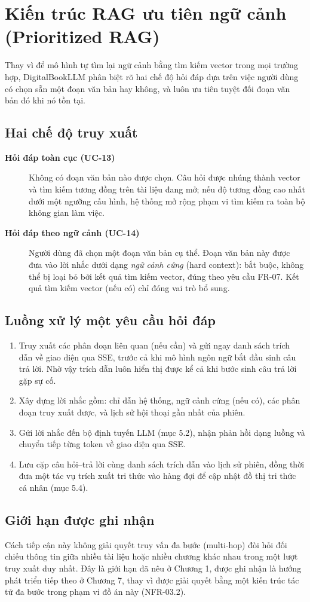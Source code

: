 \section{Kiến trúc RAG ưu tiên ngữ cảnh (Prioritized RAG)}
Thay vì để mô hình tự tìm lại ngữ cảnh bằng tìm kiếm vector trong mọi trường hợp, DigitalBookLLM phân biệt rõ hai chế độ hỏi đáp dựa trên việc người dùng có chọn sẵn một đoạn văn bản hay không, và luôn ưu tiên tuyệt đối đoạn văn bản đó khi nó tồn tại.

\subsection{Hai chế độ truy xuất}
\begin{description}
    \item[\textbf{Hỏi đáp toàn cục (UC-13)}] Không có đoạn văn bản nào được chọn. Câu hỏi được nhúng thành vector và tìm kiếm tương đồng trên tài liệu đang mở; nếu độ tương đồng cao nhất dưới một ngưỡng cấu hình, hệ thống mở rộng phạm vi tìm kiếm ra toàn bộ không gian làm việc.
    \item[\textbf{Hỏi đáp theo ngữ cảnh (UC-14)}] Người dùng đã chọn một đoạn văn bản cụ thể. Đoạn văn bản này được đưa vào lời nhắc dưới dạng \textit{ngữ cảnh cứng} (hard context): bắt buộc, không thể bị loại bỏ bởi kết quả tìm kiếm vector, đúng theo yêu cầu FR-07. Kết quả tìm kiếm vector (nếu có) chỉ đóng vai trò bổ sung.
\end{description}

\subsection{Luồng xử lý một yêu cầu hỏi đáp}
\begin{enumerate}
    \item Truy xuất các phân đoạn liên quan (nếu cần) và gửi ngay danh sách trích dẫn về giao diện qua SSE, trước cả khi mô hình ngôn ngữ bắt đầu sinh câu trả lời. Nhờ vậy trích dẫn luôn hiển thị được kể cả khi bước sinh câu trả lời gặp sự cố.
    \item Xây dựng lời nhắc gồm: chỉ dẫn hệ thống, ngữ cảnh cứng (nếu có), các phân đoạn truy xuất được, và lịch sử hội thoại gần nhất của phiên.
    \item Gửi lời nhắc đến bộ định tuyến LLM (mục 5.2), nhận phản hồi dạng luồng và chuyển tiếp từng token về giao diện qua SSE.
    \item Lưu cặp câu hỏi--trả lời cùng danh sách trích dẫn vào lịch sử phiên, đồng thời đưa một tác vụ trích xuất tri thức vào hàng đợi để cập nhật đồ thị tri thức cá nhân (mục 5.4).
\end{enumerate}

\subsection{Giới hạn được ghi nhận}
Cách tiếp cận này không giải quyết truy vấn đa bước (multi-hop) đòi hỏi đối chiếu thông tin giữa nhiều tài liệu hoặc nhiều chương khác nhau trong một lượt truy xuất duy nhất. Đây là giới hạn đã nêu ở Chương 1, được ghi nhận là hướng phát triển tiếp theo ở Chương 7, thay vì được giải quyết bằng một kiến trúc tác tử đa bước trong phạm vi đồ án này (NFR-03.2).
